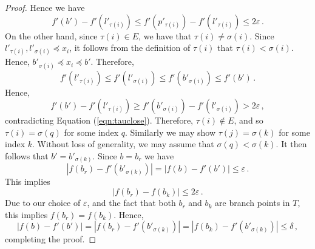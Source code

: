 \documentclass{article}
\theoremstyle{definition}
\renewcommand{\epsilon}{\varepsilon}
\begin{document}
\begin{proof}
    Hence we have
    \begin{equation}
        \label{eqn:tauclose}
        f'(b') - f'(l'_{\tau(i)}) \leq f'(p'_{\tau(i)}) - f'(l'_{\tau(i)}) \leq 2\epsilon\,.
    \end{equation}
    On the other hand, since $\tau(i) \in  E$, we have that $\tau(i) \neq \sigma(i)$. Since $l'_{\tau(i)}, l'_{\sigma(i)} \preceq x_i$, it follows from the definition of $\tau(i)$ that $\tau(i) < \sigma(i)$. Hence, $b'_{\sigma(i)} \preceq x_i \preceq b'$. Therefore,
    \begin{equation*}
        f'(l'_{\tau(i)}) \leq f'(l'_{\sigma(i)}) \leq f'(b'_{\sigma(i)}) \leq f'(b')\,.
    \end{equation*}
    Hence,
    \begin{equation*}
        f'(b') - f'(l'_{\tau(i)}) \geq  f'(b'_{\sigma(i)}) - f'(l'_{\sigma(i)}) > 2\epsilon\,,
    \end{equation*}
    contradicting Equation (\ref{eqn:tauclose}). Therefore, $\tau(i) \notin E$, and so $\tau(i) = \sigma(q)$ for some index $q$. Similarly we may show $\tau(j) = \sigma(k)$ for some index $k$. Without loss of generality, we may assume that $\sigma(q) < \sigma(k)$. It then follows that $b' = b'_{\sigma(k)}$. Since $b = b_r$ we have
    \begin{equation*}
        |f(b_r) - f'(b'_{\sigma(k)})| = |f(b) - f'(b')| \leq \epsilon\,.
    \end{equation*}
    This implies
    \begin{equation*}
        |f(b_r) - f(b_k)| \leq 2\epsilon\,.
    \end{equation*}
    Due to our choice of $\epsilon$, and the fact that both $b_r$ and $b_k$ are branch points in $T$, this implies $f(b_r) = f(b_k)$. Hence,
    \begin{equation*}
        |f(b) - f'(b')| = |f(b_r) - f'(b'_{\sigma(k)})| = |f(b_k) - f'(b'_{\sigma(k)})| \leq \delta\,,
    \end{equation*}
    completing the proof.
\end{proof}
\end{document}
